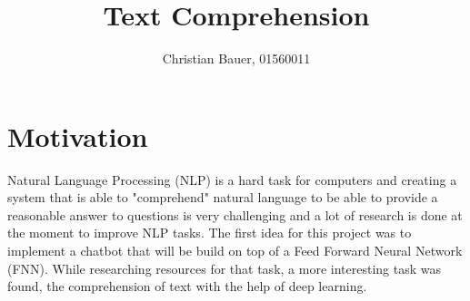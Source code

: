 
\title{Text Comprehension}
\author{Christian Bauer, 01560011}
\date{}

% 
% 




\maketitle



\tableofcontents
    
\pagebreak

    \section{Motivation}
    \label{sec:motivation}


        Natural Language Processing (NLP) is a hard task for computers and creating a system that is able to "comprehend" natural language to be able to provide a reasonable answer to questions is very challenging and a lot of research is done at the moment to improve NLP tasks.
        The first idea for this project was to implement a chatbot that will be build on top of a Feed Forward Neural Network (FNN).
        While researching resources for that task, a more interesting task was found, the comprehension of text with the help of deep learning.

